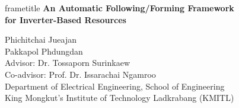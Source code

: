\documentclass{beamer}
\begin{document}
\begin{frame}[plain]
\centering
\vspace{0.75cm}
\begin{beamercolorbox}[wd=0.86\paperwidth,sep=0.22cm,center]{frametitle}
{\Large\bfseries An Automatic Following/Forming Framework\\for Inverter-Based Resources}
\end{beamercolorbox}
\vspace{0.60cm}
{\fontsize{10.5}{13}\selectfont
Phichitchai Jueajan\\
Pakkapol Phdungdan\\[0.20cm]
Advisor: Dr. Tossaporn Surinkaew\\
Co-advisor: Prof. Dr. Issarachai Ngamroo\\[0.45cm]
Department of Electrical Engineering, School of Engineering\\
King Mongkut's Institute of Technology Ladkrabang (KMITL)
}
\end{frame}
\end{document}
